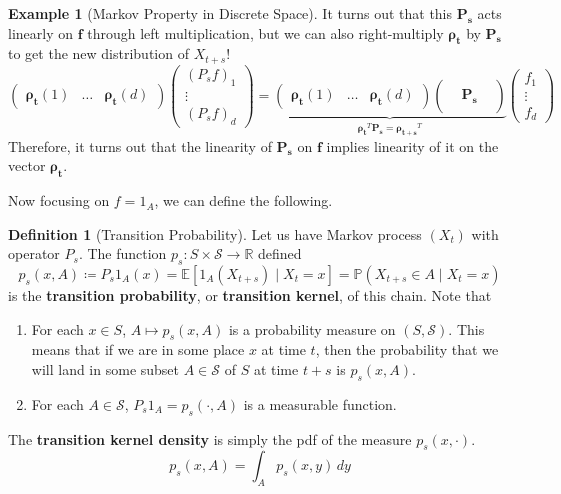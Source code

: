 \documentclass{article}
\theoremstyle{definition}
\newtheorem{example}{Example}[section]
\theoremstyle{remark}
\theoremstyle{definition}
\newtheorem{definition}{Definition}[section]
\begin{document}
\begin{example}[Markov Property in Discrete Space]
It turns out that this $\mathbf{P_s}$ acts linearly on $\mathbf{f}$ through left multiplication, but we can also right-multiply $\boldsymbol{\rho_t}$ by $\mathbf{P_s}$ to get the new distribution of $X_{t + s}$! 
\[\begin{pmatrix} \boldsymbol{\rho_t} (1) & \ldots & \boldsymbol{\rho_t} (d) \end{pmatrix} \begin{pmatrix} (P_s f)_1 \\ \vdots \\(P_s f)_d \end{pmatrix} = \underbrace{\begin{pmatrix} \boldsymbol{\rho_t} (1) & \ldots & \boldsymbol{\rho_t} (d) \end{pmatrix} \begin{pmatrix} && \\ & \mathbf{P_s} & \\ && \end{pmatrix}}_{\boldsymbol{\rho_t}^T \mathbf{P_s} = \boldsymbol{\rho_{t+s}}^T} \begin{pmatrix} f_1 \\ \vdots \\ f_d \end{pmatrix}\]
Therefore, it turns out that the linearity of $\mathbf{P_s}$ on $\mathbf{f}$ implies linearity of it on the vector $\boldsymbol{\rho_t}$. 
\end{example}

Now focusing on $f = 1_A$, we can define the following. 

\begin{definition}[Transition Probability]
Let us have Markov process $(X_t)$ with operator $P_s$. The function $p_s: S \times \mathcal{S} \rightarrow \mathbb{R}$ defined 
\[p_s(x, A) \coloneqq P_s 1_A (x) = \mathbb{E}[ 1_A (X_{t+s}) \mid X_t = x] = \mathbb{P}(X_{t + s} \in A \mid X_t = x)\]
is the \textbf{transition probability}, or \textbf{transition kernel}, of this chain. Note that 
\begin{enumerate}
    \item For each $x \in S$, $A \mapsto p_s(x, A)$ is a probability measure on $(S, \mathcal{S})$. This means that if we are in some place $x$ at time $t$, then the probability that we will land in some subset $A \in \mathcal{S}$ of $S$ at time $t + s$ is $p_s(x, A)$. 
    \item For each $A \in \mathcal{S}$, $P_s 1_A = p_s (\cdot, A)$ is a measurable function. 
\end{enumerate}
The \textbf{transition kernel density} is simply the pdf of the measure $p_s(x, \cdot)$. 
\[p_s(x, A) = \int_A p_s (x, y) \,dy\]
\end{definition}
\end{document}
